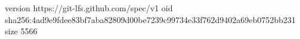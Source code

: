 version https://git-lfs.github.com/spec/v1
oid sha256:4ad9e9fdee83bf7aba82809d00be7239c99734e33f762d9402a69eb0752bb231
size 5566
